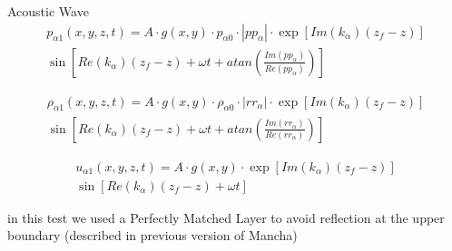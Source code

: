 \documentclass{beamer}
\begin{document}


\begin{frame}{Acoustic Wave}
\begin{eqnarray} \nonumber
p_{\alpha1}(x,y,z,t) = A \cdot g(x,y) \cdot {p_{\alpha0}} \cdot|pp_\alpha| \cdot \exp \left [Im(k_\alpha) (z_f - z) \right ] \\ 
\sin \left [ Re(k_\alpha) (z_f - z) + \omega t + atan \left (\frac{Im(pp_\alpha)}{Re(pp_\alpha)} \right ) \right ]
\end{eqnarray}

\begin{eqnarray} \nonumber
\rho_{\alpha1}(x,y,z,t) = A \cdot g(x,y) \cdot {\rho_{\alpha0}} \cdot|rr_\alpha| \cdot \exp \left [Im(k_\alpha) (z_f - z) \right ] \\ 
\sin \left [ Re(k_\alpha) (z_f - z) + \omega t + atan \left (\frac{Im(rr_\alpha)}{Re(rr_\alpha)} \right ) \right ]
\end{eqnarray}

\begin{eqnarray} \nonumber
u_{\alpha1}(x,y,z,t) = A \cdot g(x,y) \cdot  \exp \left [Im(k_\alpha) (z_f - z) \right ] \\ \sin \left [ Re(k_\alpha) (z_f - z) + \omega t  \right ]
\end{eqnarray}


in this test we used a Perfectly Matched Layer to avoid reflection at the upper boundary (described in previous version of Mancha) 



\end{frame}




\end{document}
